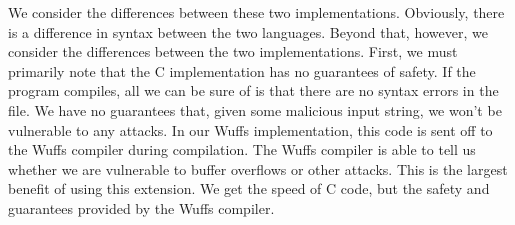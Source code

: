 \documentclass[main.tex]{subfiles}
\begin{document}
We consider the differences between these two implementations. Obviously, there is a difference in syntax
between the two languages. Beyond that, however, we consider the differences between the two implementations.
First, we must primarily note that the C implementation has no guarantees of safety. If the program compiles, all
we can be sure of is that there are no syntax errors in the file. We have no guarantees that, given some malicious
input string, we won't be vulnerable to any attacks. In our Wuffs implementation, this code is sent off to the Wuffs
compiler during compilation. The Wuffs compiler is able to tell us whether we are vulnerable to buffer overflows or
other attacks. This is the largest benefit of using this extension. We get the speed of C code, but the safety and
guarantees provided by the Wuffs compiler.
\end{document}
